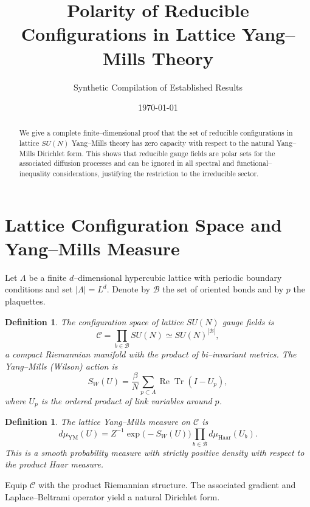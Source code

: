 \documentclass[11pt]{article}
\title{Polarity of Reducible Configurations in Lattice Yang--Mills Theory}
\author{Synthetic Compilation of Established Results}
\date{\today}
\newtheorem{definition}[theorem]{Definition}
\begin{document}
\maketitle

\begin{abstract}
We give a complete finite--dimensional proof that the set of reducible
configurations in lattice $SU(N)$ Yang--Mills theory has zero capacity
with respect to the natural Yang--Mills Dirichlet form. This shows that
reducible gauge fields are polar sets for the associated diffusion
processes and can be ignored in all spectral and functional--inequality
considerations, justifying the restriction to the irreducible sector.
\end{abstract}

\section{Lattice Configuration Space and Yang--Mills Measure}

Let $\Lambda$ be a finite $d$--dimensional hypercubic lattice with
periodic boundary conditions and set $|\Lambda| = L^d$. Denote by
$\mathcal{B}$ the set of oriented bonds and by $p$ the plaquettes.

\begin{definition}
The configuration space of lattice $SU(N)$ gauge fields is
\[
  \mathcal{C} = \prod_{b\in\mathcal{B}} SU(N) \simeq SU(N)^{|\mathcal{B}|},
\]
a compact Riemannian manifold with the product of bi--invariant metrics.
The Yang--Mills (Wilson) action is
\begin{equation}
  S_W(U) = \frac{\beta}{N}\sum_{p\subset\Lambda}
    \operatorname{Re}\operatorname{Tr}(I - U_p),
\end{equation}
where $U_p$ is the ordered product of link variables around $p$.
\end{definition}

\begin{definition}
The lattice Yang--Mills measure on $\mathcal{C}$ is
\begin{equation}
  d\mu_{\mathrm{YM}}(U)
  = Z^{-1}\exp\big(-S_W(U)\big)\prod_{b\in\mathcal{B}} d\mu_{\mathrm{Haar}}(U_b).
\end{equation}
This is a smooth probability measure with strictly positive density with
respect to the product Haar measure.
\end{definition}

Equip $\mathcal{C}$ with the product Riemannian structure. The
associated gradient and Laplace--Beltrami operator yield a natural
Dirichlet form.
\end{document}
